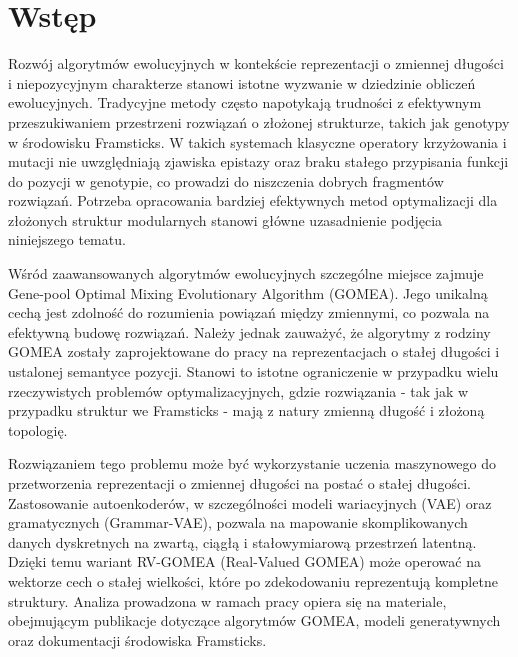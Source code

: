 \chapter{Wstęp}

Rozwój algorytmów ewolucyjnych w kontekście reprezentacji o zmiennej długości i niepozycyjnym charakterze stanowi istotne wyzwanie w dziedzinie obliczeń ewolucyjnych. Tradycyjne metody często napotykają trudności z efektywnym przeszukiwaniem przestrzeni rozwiązań o złożonej strukturze, takich jak genotypy w środowisku Framsticks. W takich systemach klasyczne operatory krzyżowania i mutacji nie uwzględniają zjawiska epistazy oraz braku stałego przypisania funkcji do pozycji w genotypie, co prowadzi do niszczenia dobrych fragmentów rozwiązań. Potrzeba opracowania bardziej efektywnych metod optymalizacji dla złożonych struktur modularnych stanowi główne uzasadnienie podjęcia niniejszego tematu.

Wśród zaawansowanych algorytmów ewolucyjnych szczególne miejsce zajmuje Gene-pool Optimal Mixing Evolutionary Algorithm (GOMEA). Jego unikalną cechą jest zdolność do rozumienia powiązań między zmiennymi, co pozwala na efektywną budowę rozwiązań. Należy jednak zauważyć, że algorytmy z rodziny GOMEA zostały zaprojektowane do pracy na reprezentacjach o stałej długości i ustalonej semantyce pozycji. Stanowi to istotne ograniczenie w przypadku wielu rzeczywistych problemów optymalizacyjnych, gdzie rozwiązania - tak jak w przypadku struktur we Framsticks - mają z natury zmienną długość i złożoną topologię.

Rozwiązaniem tego problemu może być wykorzystanie uczenia maszynowego do przetworzenia reprezentacji o zmiennej długości na postać o stałej długości. Zastosowanie autoenkoderów, w szczególności modeli wariacyjnych (VAE) oraz gramatycznych (Grammar-VAE), pozwala na mapowanie skomplikowanych danych dyskretnych na zwartą, ciągłą i stałowymiarową przestrzeń latentną. Dzięki temu wariant RV-GOMEA (Real-Valued GOMEA) może operować na wektorze cech o stałej wielkości, które po zdekodowaniu reprezentują kompletne struktury. Analiza prowadzona w ramach pracy opiera się na materiale, obejmującym publikacje dotyczące algorytmów GOMEA, modeli generatywnych oraz dokumentacji środowiska Framsticks.

